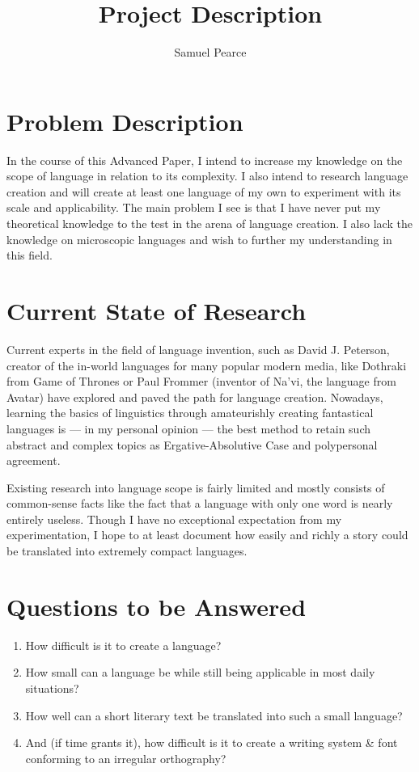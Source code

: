 \documentclass[a4paper,10pt]{article}
\title{Project Description}
\author{Samuel Pearce}
\begin{document}
\maketitle

\tableofcontents

\pagebreak

\section{Problem Description}
In the course of this Advanced Paper, I intend to increase my knowledge on the scope of
language in relation to its complexity. I also intend to research language creation and
will create at least one language of my own to experiment with its scale and applicability.
The main problem I see is that I have never put my theoretical knowledge to the test in
the arena of language creation. I also lack the knowledge on microscopic languages and
wish to further my understanding in this field.

\section{Current State of Research}
Current experts in the field of language invention, such as David J. Peterson, creator of
the in-world languages for many popular modern media, like Dothraki from Game of Thrones
or Paul Frommer (inventor of Na'vi, the language from Avatar) have explored and paved the
path for language creation. Nowadays, learning the basics of linguistics through amateurishly
creating fantastical languages is --- in my personal opinion --- the best method to retain
such abstract and complex topics as Ergative-Absolutive Case and polypersonal agreement.

Existing research into language scope is fairly limited and mostly consists of common-sense
facts like the fact that a language with only one word is nearly entirely useless. Though
I have no exceptional expectation from my experimentation, I hope to at least document how
easily and richly a story could be translated into extremely compact languages.

\section{Questions to be Answered}
\begin{enumerate}
    \item How difficult is it to create a language?
    \item How small can a language be while still being applicable in most daily situations?
    \item How well can a short literary text be translated into such a small language?
    \item And (if time grants it), how difficult is it to create a writing system \& font
          conforming to an irregular orthography?
\end{enumerate}
\end{document}
